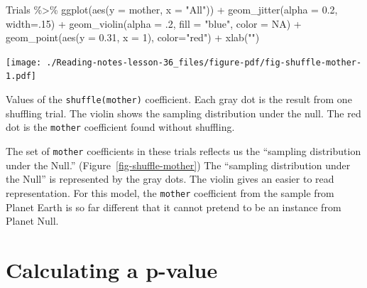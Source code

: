 \documentclass[
  letterpaper,
  DIV=11,
  numbers=noendperiod,
  oneside]{scrreprt}
\newenvironment{Shaded}{\begin{snugshade}}{\end{snugshade}}
\newcommand{\AttributeTok}[1]{\textcolor[rgb]{0.40,0.45,0.13}{#1}}
\newcommand{\ConstantTok}[1]{\textcolor[rgb]{0.56,0.35,0.01}{#1}}
\newcommand{\DecValTok}[1]{\textcolor[rgb]{0.68,0.00,0.00}{#1}}
\newcommand{\FloatTok}[1]{\textcolor[rgb]{0.68,0.00,0.00}{#1}}
\newcommand{\FunctionTok}[1]{\textcolor[rgb]{0.28,0.35,0.67}{#1}}
\newcommand{\NormalTok}[1]{\textcolor[rgb]{0.00,0.23,0.31}{#1}}
\newcommand{\SpecialCharTok}[1]{\textcolor[rgb]{0.37,0.37,0.37}{#1}}
\newcommand{\StringTok}[1]{\textcolor[rgb]{0.13,0.47,0.30}{#1}}
\begin{document}
\begin{Shaded}
\begin{Highlighting}[]
\NormalTok{Trials }\SpecialCharTok{\%\textgreater{}\%}
  \FunctionTok{ggplot}\NormalTok{(}\FunctionTok{aes}\NormalTok{(}\AttributeTok{y =}\NormalTok{ mother, }\AttributeTok{x =} \StringTok{"All"}\NormalTok{)) }\SpecialCharTok{+}
  \FunctionTok{geom\_jitter}\NormalTok{(}\AttributeTok{alpha =} \FloatTok{0.2}\NormalTok{, }\AttributeTok{width=}\NormalTok{.}\DecValTok{15}\NormalTok{) }\SpecialCharTok{+}
  \FunctionTok{geom\_violin}\NormalTok{(}\AttributeTok{alpha =}\NormalTok{ .}\DecValTok{2}\NormalTok{, }\AttributeTok{fill =} \StringTok{"blue"}\NormalTok{, }\AttributeTok{color =} \ConstantTok{NA}\NormalTok{) }\SpecialCharTok{+}
  \FunctionTok{geom\_point}\NormalTok{(}\FunctionTok{aes}\NormalTok{(}\AttributeTok{y =} \FloatTok{0.31}\NormalTok{, }\AttributeTok{x =} \DecValTok{1}\NormalTok{), }\AttributeTok{color=}\StringTok{"red"}\NormalTok{) }\SpecialCharTok{+}
  \FunctionTok{xlab}\NormalTok{(}\StringTok{""}\NormalTok{)}
\end{Highlighting}
\end{Shaded}

\begin{marginfigure}

{\centering \texttt{[image: ./Reading-notes-lesson-36\_files/figure-pdf/fig-shuffle-mother-1.pdf]}

}

\caption{\label{fig-shuffle-mother}Values of the
\texttt{shuffle(mother)} coefficient. Each gray dot is the result from
one shuffling trial. The violin shows the sampling distribution under
the null. The red dot is the \texttt{mother} coefficient found without
shuffling.}

\end{marginfigure}

The set of \texttt{mother} coefficients in these trials reflects us the
``sampling distribution under the Null.''
(Figure~\ref{fig-shuffle-mother}) The ``sampling distribution under the
Null'' is represented by the gray dots. The violin gives an easier to
read representation. For this model, the \texttt{mother} coefficient
from the sample from Planet Earth is so far different that it cannot
pretend to be an instance from Planet Null.

\hypertarget{sec-lesson-37}{%
\chapter{Calculating a p-value}\label{sec-lesson-37}}
\end{document}
